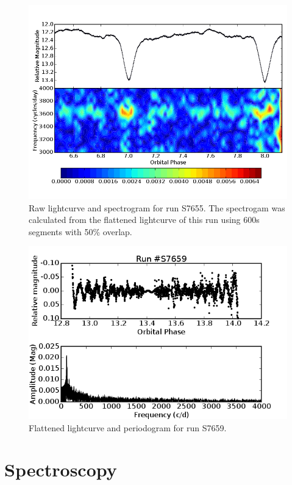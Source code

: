 \begin{figure}
 \centering
 \includegraphics[width = 0.8\columnwidth, bb=0 0 800 600]{images/trailed_FT_S7655_colour.png}
 \caption[Raw lightcurve and spectrogram for run S7655.]{Raw lightcurve and spectrogram for run S7655. The spectrogam was calculated from the flattened lightcurve of this run using 600s segments with 50\% overlap.}
 \label{trailed_ft_S7655}
\end{figure}






\begin{figure}
 \centering
 \includegraphics[width = 0.8\columnwidth, bb=0 0 600 400]{images/S7659.png}
 \caption{Flattened lightcurve and periodogram for run S7659.}
 \label{S7659}
\end{figure}




\section{Spectroscopy}

